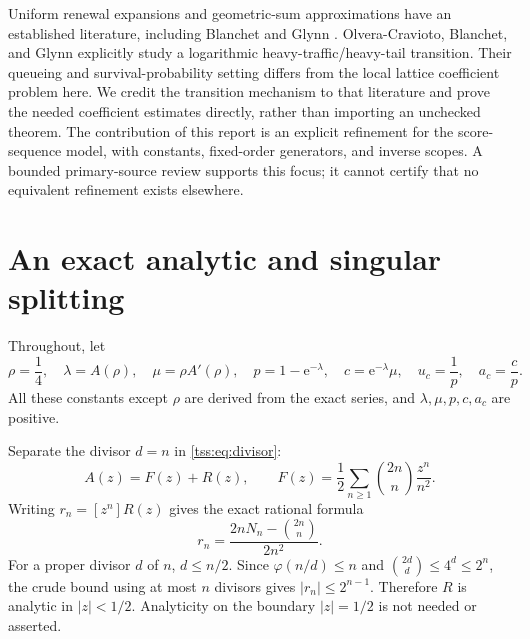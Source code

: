 \documentclass[11pt]{article}
\theoremstyle{remark}\newtheorem{remark}[theorem]{Remark}
\theoremstyle{definition}\newtheorem{definition}[theorem]{Definition}
\newcommand{\e}{\mathrm e}
\begin{document}
Uniform renewal expansions and geometric-sum approximations have an established literature, including Blanchet and Glynn \cite{BG}. Olvera-Cravioto, Blanchet, and Glynn \cite{OCBG} explicitly study a logarithmic heavy-traffic/heavy-tail transition. Their queueing and survival-probability setting differs from the local lattice coefficient problem here. We credit the transition mechanism to that literature and prove the needed coefficient estimates directly, rather than importing an unchecked theorem. The contribution of this report is an explicit refinement for the score-sequence model, with constants, fixed-order generators, and inverse scopes. A bounded primary-source review supports this focus; it cannot certify that no equivalent refinement exists elsewhere.

\section{An exact analytic and singular splitting}
\label{tss:sec:split}
Throughout, let
\begin{equation}\label{tss:eq:constants}
\rho=\frac14,\quad \lambda=A(\rho),\quad \mu=\rho A'(\rho),\quad
p=1-\e^{-\lambda},\quad c=\e^{-\lambda}\mu,\quad
u_c=\frac1p,\quad a_c=\frac cp.
\end{equation}
All these constants except $\rho$ are derived from the exact series, and $\lambda,\mu,p,c,a_c$ are positive.

Separate the divisor $d=n$ in \eqref{tss:eq:divisor}:
\begin{equation}\label{tss:eq:split}
A(z)=F(z)+R(z),\qquad
F(z)=\frac12\sum_{n\geq1}\binom{2n}{n}\frac{z^n}{n^2}.
\end{equation}
Writing $r_n=[z^n]R(z)$ gives the exact rational formula
\begin{equation}\label{tss:eq:rcoef}
r_n=\frac{2nN_n-\binom{2n}{n}}{2n^2}.
\end{equation}
For a proper divisor $d$ of $n$, $d\leq n/2$. Since $\varphi(n/d)\leq n$ and $\binom{2d}{d}\leq4^d\leq2^n$, the crude bound using at most $n$ divisors gives
$|r_n|\leq 2^{n-1}$. Therefore $R$ is analytic in $|z|<1/2$. Analyticity on the boundary $|z|=1/2$ is not needed or asserted.
\end{document}
